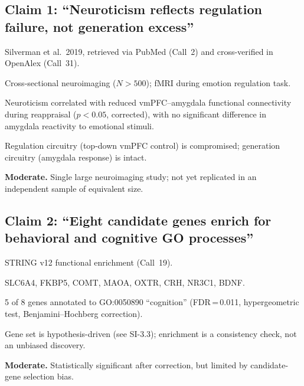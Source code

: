 \subsection*{Claim 1: ``Neuroticism reflects regulation failure, not
generation excess''}

\begin{description}[style=nextline, nosep]
  \item[Evidence source]
    Silverman et al.\ 2019, retrieved via PubMed (Call~2) and
    cross-verified in OpenAlex (Call~31).
  \item[Design]
    Cross-sectional neuroimaging ($N > 500$); fMRI during emotion regulation
    task.
  \item[Key result]
    Neuroticism correlated with reduced vmPFC--amygdala functional
    connectivity during reappraisal ($p < 0.05$, corrected), with no
    significant difference in amygdala reactivity to emotional stimuli.
  \item[Interpretation]
    Regulation circuitry (top-down vmPFC control) is compromised;
    generation circuitry (amygdala response) is intact.
  \item[Grade] \textbf{Moderate.}  Single large neuroimaging study; not yet
    replicated in an independent sample of equivalent size.
\end{description}

\subsection*{Claim 2: ``Eight candidate genes enrich for behavioral and
cognitive GO processes''}

\begin{description}[style=nextline, nosep]
  \item[Evidence source]
    STRING v12 functional enrichment (Call~19).
  \item[Gene set]
    SLC6A4, FKBP5, COMT, MAOA, OXTR, CRH, NR3C1, BDNF.
  \item[Key result]
    5 of 8 genes annotated to GO:0050890 ``cognition'' (FDR\,=\,0.011,
    hypergeometric test, Benjamini--Hochberg correction).
  \item[Caveats]
    Gene set is hypothesis-driven (see SI-3.3); enrichment is a consistency
    check, not an unbiased discovery.
  \item[Grade] \textbf{Moderate.}  Statistically significant after correction,
    but limited by candidate-gene selection bias.
\end{description}

